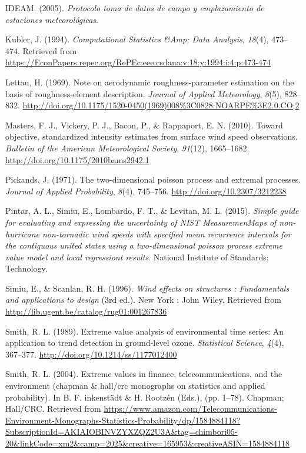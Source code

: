 \documentclass[12pt,oneside]{reedthesis}
\begin{document}
\leavevmode\hypertarget{ref-ideam2005}{}%
IDEAM. (2005). \emph{Protocolo toma de datos de campo y emplazamiento de estaciones meteorológicas}.

\leavevmode\hypertarget{ref-Kubler1994}{}%
Kubler, J. (1994). \emph{Computational Statistics \&Amp; Data Analysis}, \emph{18}(4), 473--474. Retrieved from \url{https://EconPapers.repec.org/RePEc:eee:csdana:v:18:y:1994:i:4:p:473-474}

\leavevmode\hypertarget{ref-Lettau1969}{}%
Lettau, H. (1969). Note on aerodynamic roughness-parameter estimation on the basis of roughness-element description. \emph{Journal of Applied Meteorology}, \emph{8}(5), 828--832. \url{http://doi.org/10.1175/1520-0450(1969)008\%3C0828:NOARPE\%3E2.0.CO;2}

\leavevmode\hypertarget{ref-Masters2010}{}%
Masters, F. J., Vickery, P. J., Bacon, P., \& Rappaport, E. N. (2010). Toward objective, standardized intensity estimates from surface wind speed observations. \emph{Bulletin of the American Meteorological Society}, \emph{91}(12), 1665--1682. \url{http://doi.org/10.1175/2010bams2942.1}

\leavevmode\hypertarget{ref-Pickands1971}{}%
Pickands, J. (1971). The two-dimensional poisson process and extremal processes. \emph{Journal of Applied Probability}, \emph{8}(4), 745--756. \url{http://doi.org/10.2307/3212238}

\leavevmode\hypertarget{ref-Pintar2015}{}%
Pintar, A. L., Simiu, E., Lombardo, F. T., \& Levitan, M. L. (2015). \emph{Simple guide for evaluating and expressing the uncertainty of NIST MeasuremenMaps of non-hurricane non-tornadic wind speeds with specified mean recurrence intervals for the contiguous united states using a two-dimensional poisson process extreme value model and local regressiont results}. National Institute of Standards; Technology.

\leavevmode\hypertarget{ref-Simiu1996}{}%
Simiu, E., \& Scanlan, R. H. (1996). \emph{Wind effects on structures : Fundamentals and applications to design} (3rd ed.). New York : John Wiley. Retrieved from \url{http://lib.ugent.be/catalog/rug01:001267836}

\leavevmode\hypertarget{ref-Smith1989}{}%
Smith, R. L. (1989). Extreme value analysis of environmental time series: An application to trend detection in ground-level ozone. \emph{Statistical Science}, \emph{4}(4), 367--377. \url{http://doi.org/10.1214/ss/1177012400}

\leavevmode\hypertarget{ref-Smith2004}{}%
Smith, R. L. (2004). Extreme values in finance, telecommunications, and the environment (chapman \& hall/crc monographs on statistics and applied probability). In B. F. inkenstädt \& H. Rootzén (Eds.), (pp. 1--78). Chapman; Hall/CRC. Retrieved from \url{https://www.amazon.com/Telecommunications-Environment-Monographs-Statistics-Probability/dp/1584884118?SubscriptionId=AKIAIOBINVZYXZQZ2U3A\&tag=chimbori05-20\&linkCode=xm2\&camp=2025\&creative=165953\&creativeASIN=1584884118}


\end{document}
